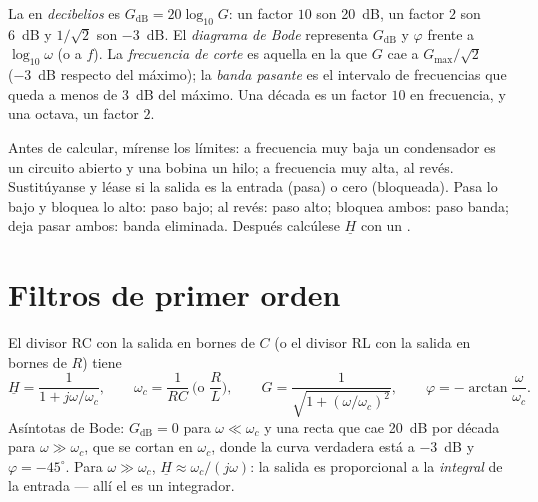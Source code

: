 \begin{definition}\label{def:b1:filters-transfer-functions:bode}
La  en \emph{decibelios} es $G_{\mathrm{dB}} = 20\log_{10}G$: un
factor $10$ son \qty{20}{dB}, un factor $2$ son \qty{6}{dB} y $1/\sqrt2$
son \qty{-3}{dB}. El \emph{diagrama de Bode} representa $G_{\mathrm{dB}}$
y $\varphi$ frente a $\log_{10}\omega$ (o a $f$). La \emph{frecuencia de
corte} es aquella en la que $G$ cae a $G_{\max}/\sqrt2$ (\qty{-3}{dB}
respecto del máximo); la \emph{banda pasante} es el intervalo de
frecuencias que queda a menos de \qty{3}{dB} del máximo. Una década es un
factor $10$ en frecuencia, y una octava, un factor $2$.
\end{definition}

\begin{method}\label{met:b1:filters-transfer-functions:nature}
Antes de calcular, mírense los límites: a frecuencia muy baja un
condensador es un circuito abierto y una bobina un hilo; a frecuencia muy
alta, al revés. Sustitúyanse y léase si la salida es la entrada (pasa) o
cero (bloqueada). Pasa lo bajo y bloquea lo alto: paso bajo; al revés:
paso alto; bloquea ambos: paso banda; deja pasar ambos: banda eliminada.
Después calcúlese $\underline H$ con un .
\end{method}

\section{Filtros de primer orden}

\begin{proposition}\label{prop:b1:filters-transfer-functions:lowpass1}
El divisor RC con la salida en bornes de $C$ (o el divisor RL con la
salida en bornes de $R$) tiene
\[
\underline H = \frac{1}{1 + j\omega/\omega_c}, \qquad
\omega_c = \frac{1}{RC} \ \Big(\text{o } \frac{R}{L}\Big),
\qquad G = \frac{1}{\sqrt{1 + (\omega/\omega_c)^2}}, \qquad
\varphi = -\arctan\frac{\omega}{\omega_c} .
\]
Asíntotas de Bode: $G_{\mathrm{dB}} = 0$ para $\omega \ll \omega_c$ y una
recta que cae \qty{20}{dB} por década para $\omega \gg \omega_c$, que se
cortan en $\omega_c$, donde la curva verdadera está a \qty{-3}{dB} y
$\varphi = -45^\circ$. Para $\omega \gg \omega_c$, $\underline H \approx
\omega_c/(j\omega)$: la salida es proporcional a la \emph{integral} de la
entrada --- allí el  es un integrador.
\end{proposition}

